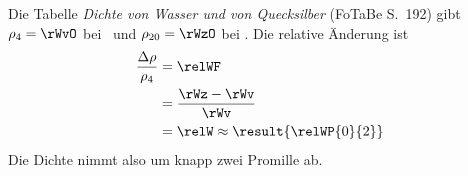 Die Tabelle \emph{Dichte von Wasser und von Quecksilber} (FoTaBe S.~192) gibt $\rho_4 = \rWvO$ bei \tWvO\ und $\rho_{20} = \rWzO$ bei \tWzO. Die relative Änderung ist
\begin{align}
 \frac{\Delta\rho}{\rho_4} &= \relWF \\
   &= \frac{\rWz-\rWv}{\rWv} \\
   &= \relW \approx \result{\relWP{0}{2}}
\end{align}
Die Dichte nimmt also um knapp zwei Promille ab.
